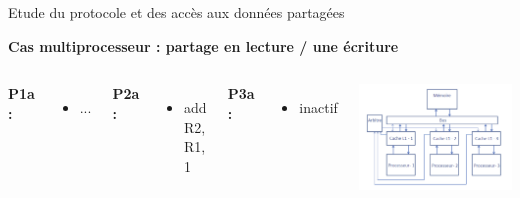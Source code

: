 \documentclass{beamer}
\begin{document}
\begin{frame}{Etude du protocole et des accès aux données partagées}
    \addtocounter{framenumber}{-1}
    \textbf{Cas multiprocesseur : partage en lecture / une écriture}
    \begin{columns}[c] %

        \textbf{P1a : }
        \begin{itemize}
            \item ...
        \end{itemize}

        \textbf{P2a : }
        \begin{itemize}
            \item add R2, R1, 1
        \end{itemize}

        \textbf{P3a : }
        \begin{itemize}
            \item inactif
        \end{itemize}

        \vspace{1cm}
        \includegraphics[scale=0.3]{archi.png}
        
    \end{columns}
\end{frame}
\end{document}

